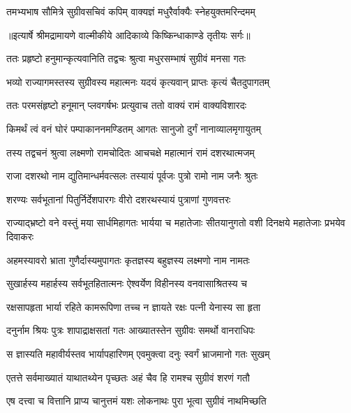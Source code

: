 \twolineshloka
{तमभ्यभाष सौमित्रे सुग्रीवसचिवं कपिम्}
{वाक्यज्ञं मधुरैर्वाक्यैः स्नेहयुक्तमरिन्दमम्} %


{॥इत्यार्षे श्रीमद्रामायणे वाल्मीकीये आदिकाव्ये किष्किन्धाकाण्डे तृतीयः सर्गः॥}


\twolineshloka
{ततः प्रहृष्टो हनुमान्कृत्यवानिति तद्वचः}
{श्रुत्वा मधुरसम्भाषं सुग्रीवं मनसा गतः} %

\twolineshloka
{भव्यो राज्यागमस्तस्य सुग्रीवस्य महात्मनः}
{यदयं कृत्यवान् प्राप्तः कृत्यं चैतदुपागतम्} %

\twolineshloka
{ततः परमसंहृष्टो हनूमान् प्लवगर्षभः}
{प्रत्युवाच ततो वाक्यं रामं वाक्यविशारदः} %

\twolineshloka
{किमर्थं त्वं वनं घोरं पम्पाकाननमण्डितम्}
{आगतः सानुजो दुर्गं नानाव्यालमृगायुतम्} %

\twolineshloka
{तस्य तद्वचनं श्रुत्वा लक्ष्मणो रामचोदितः}
{आचचक्षे महात्मानं रामं दशरथात्मजम्} %

\twolineshloka
{राजा दशरथो नाम द्युतिमान्धर्मवत्सलः}
{तस्यायं पूर्वजः पुत्रो रामो नाम जनैः श्रुतः} %

\twolineshloka
{शरण्यः सर्वभूतानां पितुर्निर्देशपारगः}
{वीरो दशरथस्यायं पुत्राणां गुणवत्तरः} %

\threelineshloka
{राज्याद्भ्रष्टो वने वस्तुं मया सार्धमिहागतः}
{भार्यया च महातेजाः सीतयानुगतो वशी}
{दिनक्षये महातेजाः प्रभयेव दिवाकरः} %

\twolineshloka
{अहमस्यावरो भ्राता गुणैर्दास्यमुपागतः}
{कृतज्ञस्य बहुज्ञस्य लक्ष्मणो नाम नामतः} %

\twolineshloka
{सुखार्हस्य महार्हस्य सर्वभूतहितात्मनः}
{ऐश्वर्येण विहीनस्य वनवासाश्रितस्य च} %

\twolineshloka
{रक्षसापहृता भार्या रहिते कामरूपिणा}
{तच्च न ज्ञायते रक्षः पत्नी येनास्य सा हृता} %

\twolineshloka
{दनुर्नाम श्रियः पुत्रः शापाद्राक्षसतां गतः}
{आख्यातस्तेन सुग्रीवः समर्थो वानराधिपः} %

\twolineshloka
{स ज्ञास्यति महावीर्यस्तव भार्यापहारिणम्}
{एवमुक्त्वा दनुः स्वर्गं भ्राजमानो गतः सुखम्} %

\twolineshloka
{एतत्ते सर्वमाख्यातं याथातथ्येन पृच्छतः}
{अहं चैव हि रामश्च सुग्रीवं शरणं गतौ} %

\twolineshloka
{एष दत्त्वा च वित्तानि प्राप्य चानुत्तमं यशः}
{लोकनाथः पुरा भूत्वा सुग्रीवं नाथमिच्छति} %

